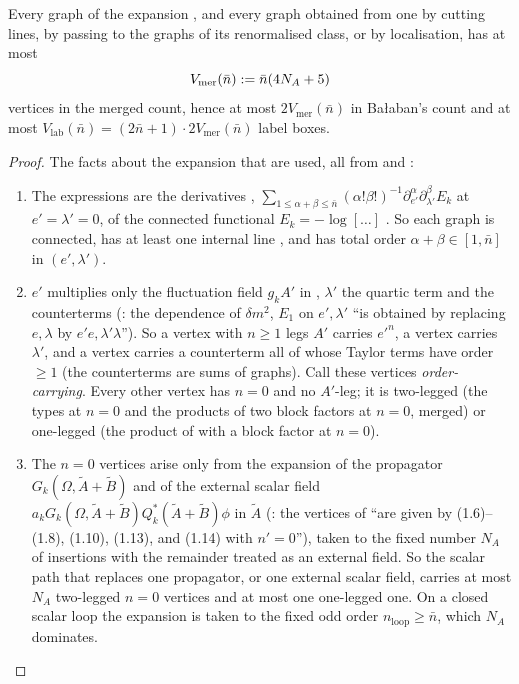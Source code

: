 \begin{lemma}\label{sup3:lem:S113}
Every graph of the expansion \cite[(1.5)]{Ba3}, and every graph obtained from one by cutting lines, by passing to the graphs of its renormalised class, or by localisation, has at most
\[
V_{\mathrm{mer}}(\bar n):=\bar n(4N_A+5)
\]
vertices in the merged count, hence at most $2V_{\mathrm{mer}}(\bar n)$ in Ba{\l}aban's count and at most $V_{\mathrm{lab}}(\bar n)=(2\bar n+1)\cdot2V_{\mathrm{mer}}(\bar n)$ label boxes.
\end{lemma}

\begin{proof}
The facts about the expansion that are used, all from \cite[pp.~412--415]{Ba3} and \cite[(3.44)--(3.47)]{Ba1}:
\begin{enumerate}[label=\textup{(E\arabic*)},nosep,leftmargin=*]
\item The expressions are the derivatives \cite[(1.5)]{Ba3}, $\sum_{1\le\alpha+\beta\le\bar n}(\alpha!\beta!)^{-1}\partial_{e'}^\alpha\partial_{\lambda'}^\beta E_k$ at $e'=\lambda'=0$, of the connected functional $E_k=-\log[\dots]$ \cite[(1.4)]{Ba3}. So each graph is connected, has at least one internal line \cite[p.~415]{Ba3}, and has total order $\alpha+\beta\in[1,\bar n]$ in $(e',\lambda')$.
\item $e'$ multiplies only the fluctuation field $g_kA'$ in \cite[(1.4)]{Ba3}, $\lambda'$ the quartic term and the counterterms (\cite[p.~419]{Ba3}: the dependence of $\delta m^2$, $E_1$ on $e',\lambda'$ ``is obtained by replacing $e,\lambda$ by $e'e,\lambda'\lambda$''). So a vertex with $n\ge1$ legs $A'$ carries $e'^n$, a \cite[(1.6)]{Ba3} vertex carries $\lambda'$, and a \cite[(1.7)]{Ba3} vertex carries a counterterm all of whose Taylor terms have order $\ge1$ (the counterterms are sums of graphs). Call these vertices \emph{order-carrying}. Every other vertex has $n=0$ and no $A'$-leg; it is two-legged (the types \cite[(1.8)--(1.11)]{Ba3} at $n=0$ and the products \cite[(1.18)]{Ba3} of two block factors at $n=0$, merged) or one-legged (the product of \cite[(1.12)]{Ba3} with a block factor at $n=0$).
\item The $n=0$ vertices arise only from the expansion \cite[(3.45)]{Ba1} of the propagator $G_k(\Omega,\tilde A+\tilde B)$ and of the external scalar field $a_kG_k(\Omega,\tilde A+\tilde B)Q_k^*(\tilde A+\tilde B)\phi$ in $\tilde A$ (\cite[p.~414]{Ba3}: the vertices of \cite[(1.5)]{Ba3} ``are given by (1.6)--(1.8), (1.10), (1.13), and (1.14) with $n'=0$''), taken to the fixed number $N_A$ of insertions with the remainder \cite[(1.16)]{Ba3} treated as an external field. So the scalar path that replaces one propagator, or one external scalar field, carries at most $N_A$ two-legged $n=0$ vertices and at most one one-legged one. On a closed scalar loop the expansion \cite[(3.46)--(3.47)]{Ba1} is taken to the fixed odd order $n_{\mathrm{loop}}\ge\bar n$, which $N_A$ dominates.

\end{enumerate}
\end{proof}
